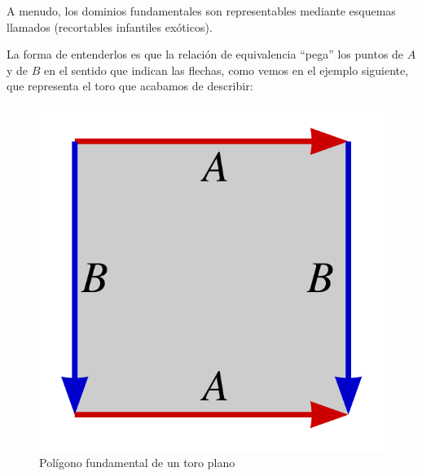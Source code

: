 	A menudo, los dominios fundamentales son representables mediante esquemas llamados  (recortables infantiles exóticos).
	
	La forma de entenderlos es que la relación de equivalencia ``pega'' los puntos de $A$ y de $B$ en el sentido que indican las flechas, como vemos en el ejemplo siguiente, que representa el toro que acabamos de describir:
	
	\begin{figure}[h!]
		\centering
		\includegraphics[scale = 0.1]{img/pol_fund_toro}
		\caption{Polígono fundamental de un toro plano}
		\label{const_img_polfun_toro}
	\end{figure}

